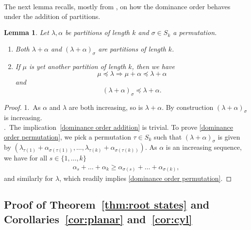 \documentclass[letterpaper, DIV=17]{scrartcl}
\newtheorem{lemma}[theorem]{Lemma}
\numberwithin{equation}{section}
\theoremstyle{definition}
\begin{document}
The next lemma recalls, mostly from \cite[Ch. 1]{macdonald1995symmetric}, on how the dominance order behaves under the addition of partitions.
		\begin{lemma}
			Let $\lambda, \alpha$ be partitions of length $k$ and $\sigma\in S_k$ a permutation. 
			\begin{enumerate}
				\item Both $\lambda+\alpha$ and $(\lambda+\alpha)_\sigma$ are partitions of length $k$.
				\item If $\mu$ is yet another partition of length $k$, then we have
				\begin{equation} \label{dominance order addition}
					\mu \preceq \lambda \Rightarrow \mu + \alpha \preceq \lambda + \alpha
				\end{equation}
				and
				\begin{equation} \label{dominance order permutation}
					(\lambda+\alpha)_\sigma \preceq \lambda+\alpha.
				\end{equation}
			\end{enumerate}
		\end{lemma}
		\begin{proof}
1.~As $\alpha$ and $\lambda$ are both increasing, so is $\lambda+\alpha$. By construction $(\lambda+\alpha)_\sigma$ is increasing.\\
.~The implication~\eqref{dominance order addition} is trivial. To prove \eqref{dominance order permutation}, we pick a permutation $\tau\in S_k$ such that $(\lambda+\alpha)_\sigma$ is given by $
					(\lambda_{\tau(1)} + \alpha_{\sigma(\tau(1))}, \dots, \lambda_{\tau(k)} + \alpha_{\sigma(\tau(k))}) $. 
				As $\alpha$ is an increasing sequence, we have for all $s\in \{1, \dots, k \}$
				\begin{align*}
					\alpha_s + \dots + \alpha_k \geq \alpha_{\sigma(s)} + \dots + \alpha_{\sigma(k)},
				\end{align*}
				and similarly for $ \lambda $, which readily implies \eqref{dominance order permutation}.
		\end{proof}


\subsection{Proof of Theorem~\ref{thm:root states} and  Corollaries~\ref{cor:planar} and~\ref{cor:cyl}}\label{subsec:ProofofRoot}
\end{document}
